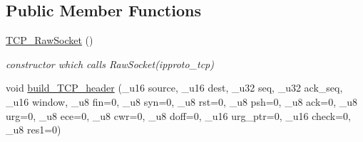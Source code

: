 \subsection*{Public Member Functions}
\begin{CompactItemize}
\item 
\hypertarget{classsocketpp_1_1TCP__RawSocket_f0b76c8fdc293bb5e22914b247b1e7b8}{
\hyperlink{classsocketpp_1_1TCP__RawSocket_f0b76c8fdc293bb5e22914b247b1e7b8}{TCP\_\-RawSocket} ()}
\label{classsocketpp_1_1TCP__RawSocket_f0b76c8fdc293bb5e22914b247b1e7b8}

\begin{CompactList}\small\item\em constructor which calls RawSocket(ipproto\_\-tcp) \item\end{CompactList}\item 
\hypertarget{classsocketpp_1_1TCP__RawSocket_461e52fdfe9533077fc1f4030f086535}{
void \hyperlink{classsocketpp_1_1TCP__RawSocket_461e52fdfe9533077fc1f4030f086535}{build\_\-TCP\_\-header} (\_\-u16 source, \_\-u16 dest, \_\-u32 seq, \_\-u32 ack\_\-seq, \_\-u16 window, \_\-u8 fin=0, \_\-u8 syn=0, \_\-u8 rst=0, \_\-u8 psh=0, \_\-u8 ack=0, \_\-u8 urg=0, \_\-u8 ece=0, \_\-u8 cwr=0, \_\-u8 doff=0, \_\-u16 urg\_\-ptr=0, \_\-u16 check=0, \_\-u8 res1=0)}
\label{classsocketpp_1_1TCP__RawSocket_461e52fdfe9533077fc1f4030f086535}


\end{CompactItemize}
